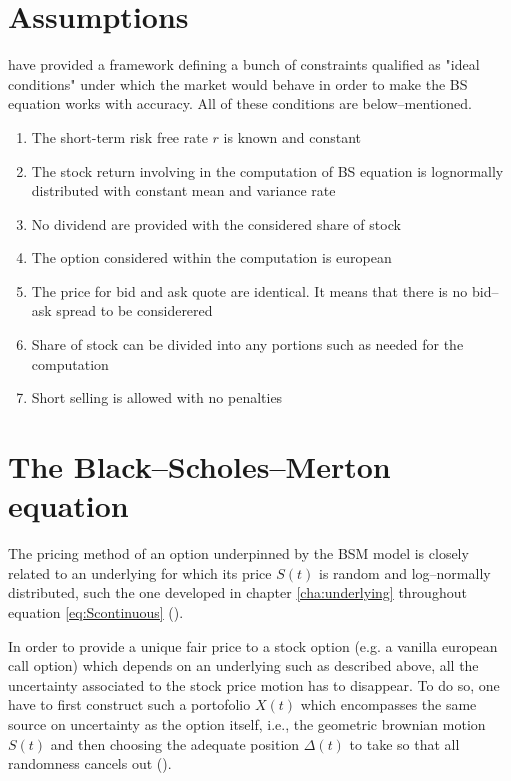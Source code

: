 \documentclass[12pt]{report}
\newcommand{\BSM}{Black--Scholes--Merton }
\newcommand{\St}{S\left(t\right)}
\begin{document}
\section{Assumptions}
\label{sec:bsm:assumptions}

\citet{bs} have provided a framework defining a bunch of constraints qualified as "ideal conditions" under which the market would behave in order to make the BS equation works with accuracy. All of these conditions are below--mentioned.

\begin{enumerate}
  \item The short-term risk free rate $r$ is known and constant
  \item The stock return involving in the computation of BS equation is lognormally distributed with constant mean and variance rate
  \item No dividend are provided with the considered share of stock
  \item The option considered within the computation is european
  \item The price for bid and ask quote are identical. It means that there is no bid--ask spread to be considerered
  \item Share of stock can be divided into any portions such as needed for the computation
  \item Short selling is allowed with no penalties
\end{enumerate}


\section{The \BSM equation}
\label{sec:bsm:equation}

The pricing method of an option underpinned by the BSM model is closely related to an underlying for which its price $\St$ is random and log--normally distributed, such the one developed in chapter \ref{cha:underlying} throughout equation \ref{eq:Scontinuous} (\citet{bs}).

In order to provide a unique fair price to a stock option (e.g. a vanilla european call option) which depends on an underlying such as described above, all the uncertainty associated to the stock price motion has to disappear. To do so, one have to first construct such a portofolio $X(t)$ which encompasses the same source on uncertainty as the option itself, i.e., the geometric brownian motion $\St$ and then choosing the adequate position $\Delta(t)$ to take  so that all randomness cancels out (\citet{shreve}).
 
\end{document}
